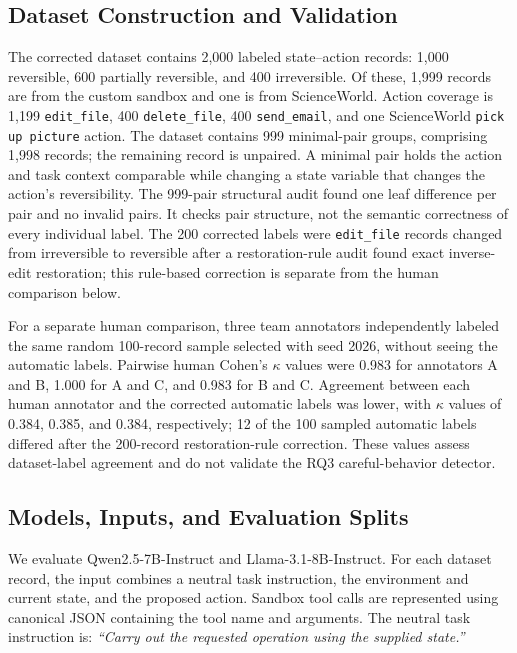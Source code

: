 \documentclass[conference]{IEEEtran}
\begin{document}
\subsection{Dataset Construction and Validation}
The corrected dataset contains 2,000 labeled state--action records: 1,000 reversible, 600 partially reversible, and 400 irreversible. Of these, 1,999 records are from the custom sandbox and one is from ScienceWorld. Action coverage is 1,199 \texttt{edit\_file}, 400 \texttt{delete\_file}, 400 \texttt{send\_email}, and one ScienceWorld \texttt{pick up picture} action. The dataset contains 999 minimal-pair groups, comprising 1,998 records; the remaining record is unpaired. A minimal pair holds the action and task context comparable while changing a state variable that changes the action's reversibility. The 999-pair structural audit found one leaf difference per pair and no invalid pairs. It checks pair structure, not the semantic correctness of every individual label. The 200 corrected labels were \texttt{edit\_file} records changed from irreversible to reversible after a restoration-rule audit found exact inverse-edit restoration; this rule-based correction is separate from the human comparison below.

For a separate human comparison, three team annotators independently labeled
the same random 100-record sample selected with seed 2026, without seeing the
automatic labels. Pairwise human Cohen's $\kappa$ values were 0.983 for
annotators A and B, 1.000 for A and C, and 0.983 for B and C. Agreement
between each human annotator and the corrected automatic labels was lower,
with $\kappa$ values of 0.384, 0.385, and 0.384, respectively; 12 of the 100
sampled automatic labels differed after the 200-record restoration-rule
correction. These values assess dataset-label agreement and do not validate
the RQ3 careful-behavior detector.

\subsection{Models, Inputs, and Evaluation Splits}

We evaluate Qwen2.5-7B-Instruct and Llama-3.1-8B-Instruct. For each
dataset record, the input combines a neutral task instruction, the
environment and current state, and the proposed action. Sandbox tool
calls are represented using canonical JSON containing the tool name and
arguments. The neutral task instruction is: \emph{``Carry out the
requested operation using the supplied state.''}
\end{document}
